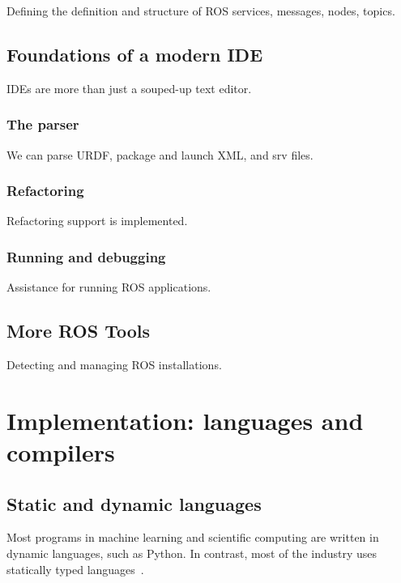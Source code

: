 \documentclass[12pt,initial,twoside,maitrise]{dms}
\numberwithin{equation}{section}
\numberwithin{table}{chapter}
\numberwithin{figure}{chapter}
\begin{document}
Defining the definition and structure of ROS services, messages, nodes, topics.

\section{Foundations of a modern IDE}

IDEs are more than just a souped-up text editor.

\subsection{The parser}

We can parse URDF, package and launch XML, and srv files.

\subsection{Refactoring}

Refactoring support is implemented.

\subsection{Running and debugging}

Assistance for running ROS applications.

\section{More ROS Tools}

Detecting and managing ROS installations.

\chapter{Implementation: languages and compilers}\label{ch:kotlingrad}


\section{Static and dynamic languages}

Most programs in machine learning and scientific computing are written in dynamic languages, such as Python. In contrast, most of the industry uses statically typed languages~\cite{github}.
\end{document}
